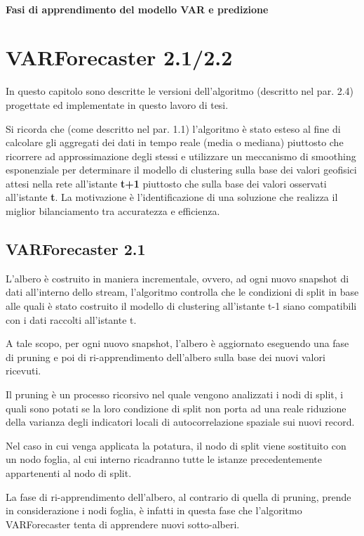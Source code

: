 \documentclass[12pt,a4paper,twoside,openright]{book}
\begin{document}
\subsubsection{Fasi di apprendimento del modello VAR e predizione}
\chapter{VARForecaster 2.1/2.2}
In questo capitolo sono descritte le versioni dell'algoritmo (descritto nel par. 2.4) progettate ed implementate in questo lavoro di tesi. 

Si ricorda che (come descritto nel par. 1.1) l'algoritmo è stato esteso al fine di calcolare gli aggregati dei dati in tempo reale (media o mediana) piuttosto che ricorrere ad approssimazione degli stessi e utilizzare un meccanismo di smoothing esponenziale per determinare il modello di clustering sulla base dei valori geofisici attesi nella rete all'istante {\bfseries t+1} piuttosto che sulla base dei valori osservati all'istante {\bfseries t}. La motivazione è l'identificazione di una soluzione che realizza il miglior bilanciamento tra accuratezza e efficienza.
\section{VARForecaster 2.1}
L'albero è costruito in maniera incrementale, ovvero, ad ogni nuovo snapshot di dati all'interno dello stream, l'algoritmo controlla che le condizioni di split in base alle quali è stato costruito il modello di clustering all'istante t-1 siano compatibili con i dati raccolti all'istante t.

A tale scopo, per ogni nuovo snapshot, l'albero è aggiornato eseguendo una fase di pruning e poi di ri-apprendimento dell'albero sulla base dei nuovi valori ricevuti. 

Il pruning è un processo ricorsivo nel quale vengono analizzati i nodi di split, i quali sono potati se la loro condizione di split non porta ad una reale riduzione della varianza degli indicatori locali di autocorrelazione spaziale sui nuovi record. 

Nel caso in cui venga applicata la potatura, il nodo di split viene sostituito con un nodo foglia, al cui interno ricadranno tutte le istanze precedentemente appartenenti al nodo di split. 

La fase di ri-apprendimento dell'albero, al contrario di quella di pruning, prende in considerazione i nodi foglia, è infatti in questa fase che l'algoritmo VARForecaster tenta di apprendere nuovi sotto-alberi.
\end{document}
